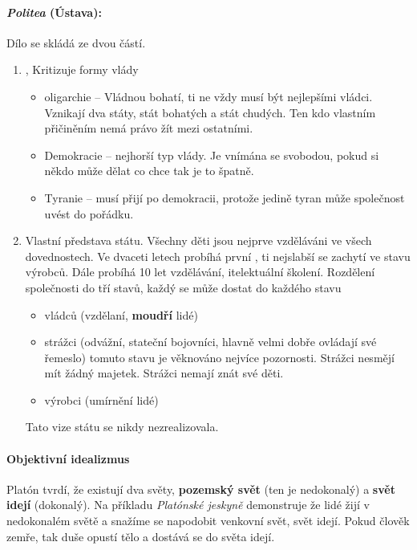 \documentclass[10pt,a4paper,
twoside,%
]{report}
\begin{document}
 \paragraph{\emph{Politea} (Ústava):} Dílo se skládá ze dvou částí. \begin{enumerate}
 \item {}, Kritizuje formy vlády \begin{itemize}
 	\item oligarchie -- Vládnou bohatí, ti ne vždy musí být nejlepšími vládci. Vznikají dva státy, stát bohatých a stát chudých. Ten kdo vlastním přičiněním nemá právo žít mezi ostatními.
 	\item Demokracie -- nejhorší typ vlády. Je vnímána se svobodou, pokud si někdo může dělat co chce tak je to špatně.
 	\item Tyranie -- musí přijí po demokracii, protože jedině tyran může společnost uvést do pořádku. 
	\end{itemize}  

\item Vlastní představa státu. Všechny děti jsou nejprve vzděláváni ve všech dovednostech. Ve dvaceti letech probíhá první , ti nejslabší se zachytí ve stavu výrobců. Dále probíhá 10 let vzdělávání, itelektuální školení. Rozdělení společnosti do tří stavů, každý se může dostat do každého stavu\begin{itemize}
\item vládců (vzdělaní, \textbf{moudří} lidé)
\item strážci (odvážní, stateční bojovníci, hlavně velmi dobře ovládají své řemeslo) tomuto stavu je věknováno nejvíce pozornosti. Strážci nesmějí mít žádný majetek. Strážci nemají znát své děti.
\item výrobci (umírnění lidé)
\end{itemize}

Tato vize státu se nikdy nezrealizovala.

 \end{enumerate}

\paragraph{Objektivní idealizmus} Platón tvrdí, že existují dva světy, \textbf{pozemský svět} (ten je nedokonalý) a \textbf{svět idejí} (dokonalý). Na příkladu \emph{Platónské jeskyně} demonstruje že lidé žijí v nedokonalém světě  a snažíme se napodobit venkovní svět, svět idejí. Pokud člověk zemře, tak duše opustí tělo a dostává se do světa idejí.
 
\end{document}
